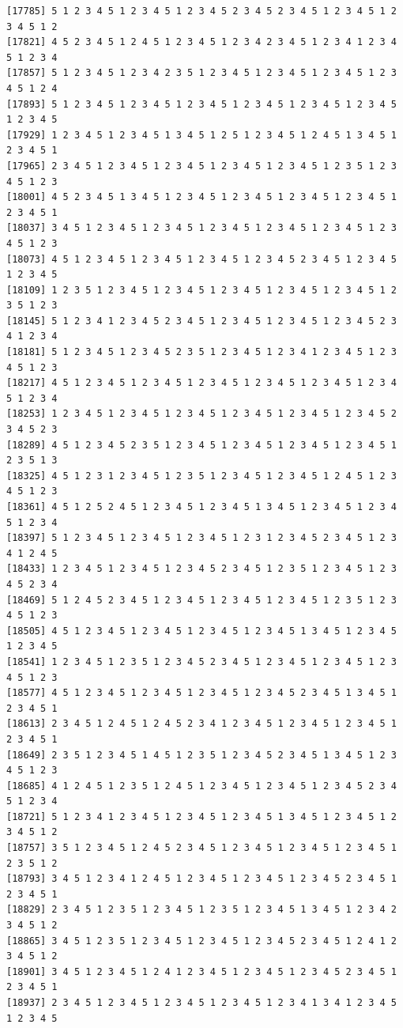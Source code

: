 \documentclass[
  english,
]{book}
\begin{document}
\begin{verbatim}
[17785] 5 1 2 3 4 5 1 2 3 4 5 1 2 3 4 5 2 3 4 5 2 3 4 5 1 2 3 4 5 1 2 3 4 5 1 2
[17821] 4 5 2 3 4 5 1 2 4 5 1 2 3 4 5 1 2 3 4 2 3 4 5 1 2 3 4 1 2 3 4 5 1 2 3 4
[17857] 5 1 2 3 4 5 1 2 3 4 2 3 5 1 2 3 4 5 1 2 3 4 5 1 2 3 4 5 1 2 3 4 5 1 2 4
[17893] 5 1 2 3 4 5 1 2 3 4 5 1 2 3 4 5 1 2 3 4 5 1 2 3 4 5 1 2 3 4 5 1 2 3 4 5
[17929] 1 2 3 4 5 1 2 3 4 5 1 3 4 5 1 2 5 1 2 3 4 5 1 2 4 5 1 3 4 5 1 2 3 4 5 1
[17965] 2 3 4 5 1 2 3 4 5 1 2 3 4 5 1 2 3 4 5 1 2 3 4 5 1 2 3 5 1 2 3 4 5 1 2 3
[18001] 4 5 2 3 4 5 1 3 4 5 1 2 3 4 5 1 2 3 4 5 1 2 3 4 5 1 2 3 4 5 1 2 3 4 5 1
[18037] 3 4 5 1 2 3 4 5 1 2 3 4 5 1 2 3 4 5 1 2 3 4 5 1 2 3 4 5 1 2 3 4 5 1 2 3
[18073] 4 5 1 2 3 4 5 1 2 3 4 5 1 2 3 4 5 1 2 3 4 5 2 3 4 5 1 2 3 4 5 1 2 3 4 5
[18109] 1 2 3 5 1 2 3 4 5 1 2 3 4 5 1 2 3 4 5 1 2 3 4 5 1 2 3 4 5 1 2 3 5 1 2 3
[18145] 5 1 2 3 4 1 2 3 4 5 2 3 4 5 1 2 3 4 5 1 2 3 4 5 1 2 3 4 5 2 3 4 1 2 3 4
[18181] 5 1 2 3 4 5 1 2 3 4 5 2 3 5 1 2 3 4 5 1 2 3 4 1 2 3 4 5 1 2 3 4 5 1 2 3
[18217] 4 5 1 2 3 4 5 1 2 3 4 5 1 2 3 4 5 1 2 3 4 5 1 2 3 4 5 1 2 3 4 5 1 2 3 4
[18253] 1 2 3 4 5 1 2 3 4 5 1 2 3 4 5 1 2 3 4 5 1 2 3 4 5 1 2 3 4 5 2 3 4 5 2 3
[18289] 4 5 1 2 3 4 5 2 3 5 1 2 3 4 5 1 2 3 4 5 1 2 3 4 5 1 2 3 4 5 1 2 3 5 1 3
[18325] 4 5 1 2 3 1 2 3 4 5 1 2 3 5 1 2 3 4 5 1 2 3 4 5 1 2 4 5 1 2 3 4 5 1 2 3
[18361] 4 5 1 2 5 2 4 5 1 2 3 4 5 1 2 3 4 5 1 3 4 5 1 2 3 4 5 1 2 3 4 5 1 2 3 4
[18397] 5 1 2 3 4 5 1 2 3 4 5 1 2 3 4 5 1 2 3 1 2 3 4 5 2 3 4 5 1 2 3 4 1 2 4 5
[18433] 1 2 3 4 5 1 2 3 4 5 1 2 3 4 5 2 3 4 5 1 2 3 5 1 2 3 4 5 1 2 3 4 5 2 3 4
[18469] 5 1 2 4 5 2 3 4 5 1 2 3 4 5 1 2 3 4 5 1 2 3 4 5 1 2 3 5 1 2 3 4 5 1 2 3
[18505] 4 5 1 2 3 4 5 1 2 3 4 5 1 2 3 4 5 1 2 3 4 5 1 3 4 5 1 2 3 4 5 1 2 3 4 5
[18541] 1 2 3 4 5 1 2 3 5 1 2 3 4 5 2 3 4 5 1 2 3 4 5 1 2 3 4 5 1 2 3 4 5 1 2 3
[18577] 4 5 1 2 3 4 5 1 2 3 4 5 1 2 3 4 5 1 2 3 4 5 2 3 4 5 1 3 4 5 1 2 3 4 5 1
[18613] 2 3 4 5 1 2 4 5 1 2 4 5 2 3 4 1 2 3 4 5 1 2 3 4 5 1 2 3 4 5 1 2 3 4 5 1
[18649] 2 3 5 1 2 3 4 5 1 4 5 1 2 3 5 1 2 3 4 5 2 3 4 5 1 3 4 5 1 2 3 4 5 1 2 3
[18685] 4 1 2 4 5 1 2 3 5 1 2 4 5 1 2 3 4 5 1 2 3 4 5 1 2 3 4 5 2 3 4 5 1 2 3 4
[18721] 5 1 2 3 4 1 2 3 4 5 1 2 3 4 5 1 2 3 4 5 1 3 4 5 1 2 3 4 5 1 2 3 4 5 1 2
[18757] 3 5 1 2 3 4 5 1 2 4 5 2 3 4 5 1 2 3 4 5 1 2 3 4 5 1 2 3 4 5 1 2 3 5 1 2
[18793] 3 4 5 1 2 3 4 1 2 4 5 1 2 3 4 5 1 2 3 4 5 1 2 3 4 5 2 3 4 5 1 2 3 4 5 1
[18829] 2 3 4 5 1 2 3 5 1 2 3 4 5 1 2 3 5 1 2 3 4 5 1 3 4 5 1 2 3 4 2 3 4 5 1 2
[18865] 3 4 5 1 2 3 5 1 2 3 4 5 1 2 3 4 5 1 2 3 4 5 2 3 4 5 1 2 4 1 2 3 4 5 1 2
[18901] 3 4 5 1 2 3 4 5 1 2 4 1 2 3 4 5 1 2 3 4 5 1 2 3 4 5 2 3 4 5 1 2 3 4 5 1
[18937] 2 3 4 5 1 2 3 4 5 1 2 3 4 5 1 2 3 4 5 1 2 3 4 1 3 4 1 2 3 4 5 1 2 3 4 5

\end{verbatim}
\end{document}

